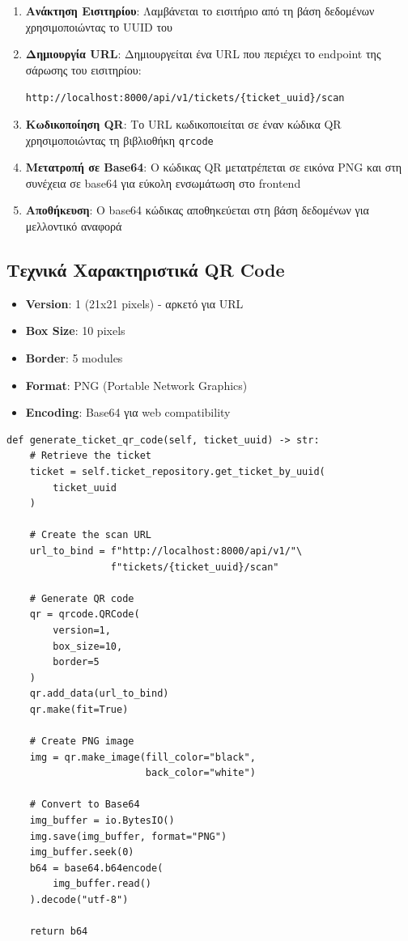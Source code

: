 \documentclass[12pt,a4paper]{report}
\begin{document}
\begin{enumerate}
    \item \textbf{Ανάκτηση Εισιτηρίου}: Λαμβάνεται το εισιτήριο από τη βάση δεδομένων χρησιμοποιώντας το UUID του
    
    \item \textbf{Δημιουργία URL}: Δημιουργείται ένα URL που περιέχει το endpoint της σάρωσης του εισιτηρίου:
    \begin{center}
        \texttt{http://localhost:8000/api/v1/tickets/\{ticket\_uuid\}/scan}
    \end{center}
    
    \item \textbf{Κωδικοποίηση QR}: Το URL κωδικοποιείται σε έναν κώδικα QR χρησιμοποιώντας τη βιβλιοθήκη \texttt{qrcode}
    
    \item \textbf{Μετατροπή σε Base64}: Ο κώδικας QR μετατρέπεται σε εικόνα PNG και στη συνέχεια σε base64 για εύκολη ενσωμάτωση στο frontend
    
    \item \textbf{Αποθήκευση}: Ο base64 κώδικας αποθηκεύεται στη βάση δεδομένων για μελλοντικό αναφορά
\end{enumerate}

\subsection{Τεχνικά Χαρακτηριστικά QR Code}

\begin{itemize}
    \item \textbf{Version}: 1 (21x21 pixels) - αρκετό για URL
    \item \textbf{Box Size}: 10 pixels
    \item \textbf{Border}: 5 modules
    \item \textbf{Format}: PNG (Portable Network Graphics)
    \item \textbf{Encoding}: Base64 για web compatibility
\end{itemize}

\begin{lstlisting}[caption=QR Code Generation]
def generate_ticket_qr_code(self, ticket_uuid) -> str:
    # Retrieve the ticket
    ticket = self.ticket_repository.get_ticket_by_uuid(
        ticket_uuid
    )
    
    # Create the scan URL
    url_to_bind = f"http://localhost:8000/api/v1/"\
                  f"tickets/{ticket_uuid}/scan"
    
    # Generate QR code
    qr = qrcode.QRCode(
        version=1,
        box_size=10,
        border=5
    )
    qr.add_data(url_to_bind)
    qr.make(fit=True)
    
    # Create PNG image
    img = qr.make_image(fill_color="black", 
                        back_color="white")
    
    # Convert to Base64
    img_buffer = io.BytesIO()
    img.save(img_buffer, format="PNG")
    img_buffer.seek(0)
    b64 = base64.b64encode(
        img_buffer.read()
    ).decode("utf-8")
    
    return b64
\end{lstlisting}
\end{document}
